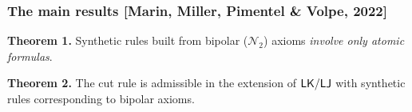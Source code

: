 \documentclass[9pt]{beamer}
\begin{document}
\begin{frame}
\frametitle{The main results [Marin, Miller, Pimentel \& Volpe, 2022]}	
	
	\begin{block}{}
		\textbf{Theorem 1.} 
		Synthetic rules built from bipolar ($\mathcal{N}_2$) axioms 
                \emph{involve only atomic formulas}.
	\end{block}
	
	\bigskip
	
	\begin{block}{}
		\textbf{Theorem 2.} 
		The cut rule is admissible in the extension of $\mathsf{LK}/\mathsf{LJ}$ with 
                synthetic rules corresponding to bipolar axioms.
	\end{block}


\end{frame}
\end{document}
